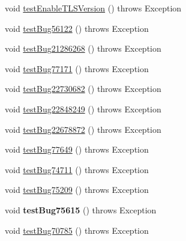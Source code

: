 \begin{DoxyCompactItemize}
\item 
void \mbox{\hyperlink{classtestsuite_1_1regression_1_1_connection_regression_test_aaf770f994d6d32e25429a79c91cbc18b}{test\+Enable\+T\+L\+S\+Version}} ()  throws Exception 
\item 
void \mbox{\hyperlink{classtestsuite_1_1regression_1_1_connection_regression_test_a01aacf5829d6396bc8569ffc5b6679b8}{test\+Bug56122}} ()  throws Exception 
\item 
void \mbox{\hyperlink{classtestsuite_1_1regression_1_1_connection_regression_test_ab5a03581f2da17e71bf3d9449439c888}{test\+Bug21286268}} ()  throws Exception 
\item 
void \mbox{\hyperlink{classtestsuite_1_1regression_1_1_connection_regression_test_adca05ee2426734f0d6b5bdf2c98ceeef}{test\+Bug77171}} ()  throws Exception 
\item 
void \mbox{\hyperlink{classtestsuite_1_1regression_1_1_connection_regression_test_a415dfcfbf9a9c7542bc8defe119ee97c}{test\+Bug22730682}} ()  throws Exception 
\item 
void \mbox{\hyperlink{classtestsuite_1_1regression_1_1_connection_regression_test_a9c80414050a22a9ebafdb247f107d6f2}{test\+Bug22848249}} ()  throws Exception 
\item 
void \mbox{\hyperlink{classtestsuite_1_1regression_1_1_connection_regression_test_a36543b7a9aa8ea81c2e039db4955494c}{test\+Bug22678872}} ()  throws Exception 
\item 
void \mbox{\hyperlink{classtestsuite_1_1regression_1_1_connection_regression_test_ad3b1937f8602e34bfceaeaf3229c9e68}{test\+Bug77649}} ()  throws Exception 
\item 
void \mbox{\hyperlink{classtestsuite_1_1regression_1_1_connection_regression_test_a9c03aad693cf9263c8523b7d3c65f223}{test\+Bug74711}} ()  throws Exception 
\item 
void \mbox{\hyperlink{classtestsuite_1_1regression_1_1_connection_regression_test_a0cc242ab6f5c5f0c1bb19d14d37bb866}{test\+Bug75209}} ()  throws Exception 
\item 
\mbox{\label{classtestsuite_1_1regression_1_1_connection_regression_test_a7f267194efdf847a2f291c1831abcde6}} 
void {\bfseries test\+Bug75615} ()  throws Exception 
\item 
void \mbox{\hyperlink{classtestsuite_1_1regression_1_1_connection_regression_test_a2e9ffad8504db4b26677d74c5f5b0a65}{test\+Bug70785}} ()  throws Exception 
\item 

\end{DoxyCompactItemize}
